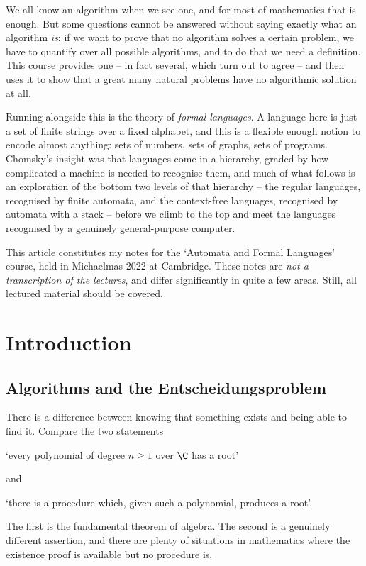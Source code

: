 



We all know an algorithm when we see one, and for most of mathematics that is enough. But some questions cannot be answered without saying exactly what an algorithm \emph{is}: if we want to prove that no algorithm solves a certain problem, we have to quantify over all possible algorithms, and to do that we need a definition. This course provides one -- in fact several, which turn out to agree -- and then uses it to show that a great many natural problems have no algorithmic solution at all.

Running alongside this is the theory of \emph{formal languages}. A language here is just a set of finite strings over a fixed alphabet, and this is a flexible enough notion to encode almost anything: sets of numbers, sets of graphs, sets of programs. Chomsky's insight was that languages come in a hierarchy, graded by how complicated a machine is needed to recognise them, and much of what follows is an exploration of the bottom two levels of that hierarchy -- the regular languages, recognised by finite automata, and the context-free languages, recognised by automata with a stack -- before we climb to the top and meet the languages recognised by a genuinely general-purpose computer.

This article constitutes my notes for the `Automata and Formal Languages' course, held in Michaelmas 2022 at Cambridge. These notes are \emph{not a transcription of the lectures}, and differ significantly in quite a few areas. Still, all lectured material should be covered.



\section{Introduction}

\subsection{Algorithms and the Entscheidungsproblem}

There is a difference between knowing that something exists and being able to find it. Compare the two statements
\begin{center}
`every polynomial of degree $n \geq 1$ over $\C$ has a root'
\end{center}
and
\begin{center}
`there is a procedure which, given such a polynomial, produces a root'.
\end{center}
The first is the fundamental theorem of algebra. The second is a genuinely different assertion, and there are plenty of situations in mathematics where the existence proof is available but no procedure is.

